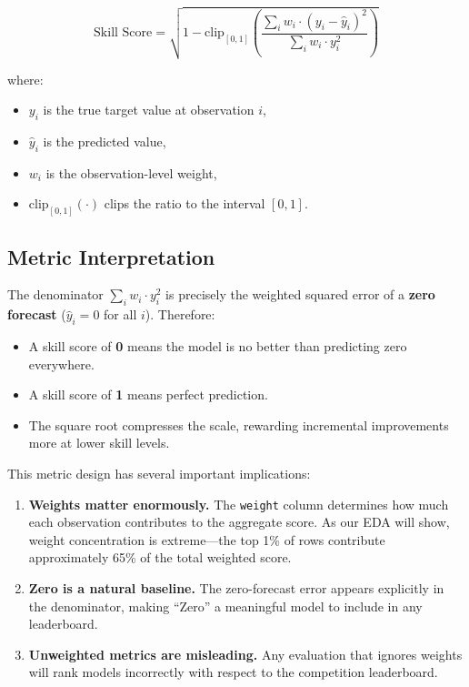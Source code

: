 \begin{equation}
\text{Skill Score} = \sqrt{1 - \text{clip}_{[0,1]}\!\left(\frac{\sum_i w_i \cdot (y_i - \hat{y}_i)^2}{\sum_i w_i \cdot y_i^2}\right)}
\label{eq:skill_score}
\end{equation}

where:
\begin{itemize}
    \item $y_i$ is the true target value at observation $i$,
    \item $\hat{y}_i$ is the predicted value,
    \item $w_i$ is the observation-level weight,
    \item $\text{clip}_{[0,1]}(\cdot)$ clips the ratio to the interval $[0, 1]$.
\end{itemize}

\subsection{Metric Interpretation}

The denominator $\sum_i w_i \cdot y_i^2$ is precisely the weighted squared error of a \textbf{zero forecast} ($\hat{y}_i = 0$ for all $i$). Therefore:

\begin{itemize}
    \item A skill score of \textbf{0} means the model is no better than predicting zero everywhere.
    \item A skill score of \textbf{1} means perfect prediction.
    \item The square root compresses the scale, rewarding incremental improvements more at lower skill levels.
\end{itemize}

This metric design has several important implications:
\begin{enumerate}
    \item \textbf{Weights matter enormously.} The \texttt{weight} column determines how much each observation contributes to the aggregate score. As our EDA will show, weight concentration is extreme---the top 1\% of rows contribute approximately 65\% of the total weighted score.
    \item \textbf{Zero is a natural baseline.} The zero-forecast error appears explicitly in the denominator, making ``Zero'' a meaningful model to include in any leaderboard.
    \item \textbf{Unweighted metrics are misleading.} Any evaluation that ignores weights will rank models incorrectly with respect to the competition leaderboard.
\end{enumerate}

